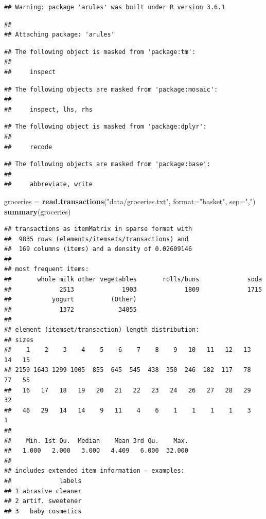 \documentclass[]{article}
\newenvironment{Shaded}{\begin{snugshade}}{\end{snugshade}}
\newcommand{\DataTypeTok}[1]{\textcolor[rgb]{0.13,0.29,0.53}{#1}}
\newcommand{\KeywordTok}[1]{\textcolor[rgb]{0.13,0.29,0.53}{\textbf{#1}}}
\newcommand{\NormalTok}[1]{#1}
\newcommand{\StringTok}[1]{\textcolor[rgb]{0.31,0.60,0.02}{#1}}
\begin{document}
\begin{verbatim}
## Warning: package 'arules' was built under R version 3.6.1
\end{verbatim}

\begin{verbatim}
## 
## Attaching package: 'arules'
\end{verbatim}

\begin{verbatim}
## The following object is masked from 'package:tm':
## 
##     inspect
\end{verbatim}

\begin{verbatim}
## The following objects are masked from 'package:mosaic':
## 
##     inspect, lhs, rhs
\end{verbatim}

\begin{verbatim}
## The following object is masked from 'package:dplyr':
## 
##     recode
\end{verbatim}

\begin{verbatim}
## The following objects are masked from 'package:base':
## 
##     abbreviate, write
\end{verbatim}

\begin{Shaded}
\begin{Highlighting}[]
\NormalTok{groceries =}\StringTok{ }\KeywordTok{read.transactions}\NormalTok{(}\StringTok{"data/groceries.txt"}\NormalTok{, }\DataTypeTok{format=}\StringTok{"basket"}\NormalTok{, }\DataTypeTok{sep=}\StringTok{","}\NormalTok{)}
\KeywordTok{summary}\NormalTok{(groceries)}
\end{Highlighting}
\end{Shaded}

\begin{verbatim}
## transactions as itemMatrix in sparse format with
##  9835 rows (elements/itemsets/transactions) and
##  169 columns (items) and a density of 0.02609146 
## 
## most frequent items:
##       whole milk other vegetables       rolls/buns             soda 
##             2513             1903             1809             1715 
##           yogurt          (Other) 
##             1372            34055 
## 
## element (itemset/transaction) length distribution:
## sizes
##    1    2    3    4    5    6    7    8    9   10   11   12   13   14   15 
## 2159 1643 1299 1005  855  645  545  438  350  246  182  117   78   77   55 
##   16   17   18   19   20   21   22   23   24   26   27   28   29   32 
##   46   29   14   14    9   11    4    6    1    1    1    1    3    1 
## 
##    Min. 1st Qu.  Median    Mean 3rd Qu.    Max. 
##   1.000   2.000   3.000   4.409   6.000  32.000 
## 
## includes extended item information - examples:
##             labels
## 1 abrasive cleaner
## 2 artif. sweetener
## 3   baby cosmetics
\end{verbatim}
\end{document}
